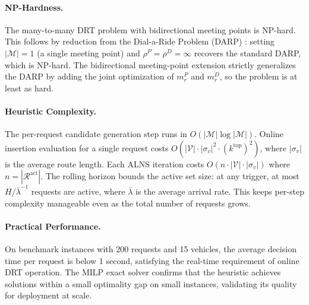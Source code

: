 \paragraph{NP-Hardness.}
The many-to-many DRT problem with bidirectional meeting points is NP-hard. This follows
by reduction from the Dial-a-Ride Problem (DARP) \citep{cordeau2007}: setting
$|\mathcal{M}| = 1$ (a single meeting point) and $\rho^P = \rho^D = \infty$ recovers
the standard DARP, which is NP-hard. The bidirectional meeting-point extension strictly
generalizes the DARP by adding the joint optimization of $m_r^P$ and $m_r^D$, so the
problem is at least as hard.

\paragraph{Heuristic Complexity.}
The per-request candidate generation step runs in $O(|\mathcal{M}| \log |\mathcal{M}|)$.
Online insertion evaluation for a single request costs
$O(|\mathcal{V}| \cdot |\sigma_v|^2 \cdot (k^{\text{top}})^2)$, where $|\sigma_v|$ is
the average route length. Each ALNS iteration costs
$O(n \cdot |\mathcal{V}| \cdot |\sigma_v|)$ where $n = |\mathcal{R}^{\text{act}}|$.
The rolling horizon bounds the active set size: at any trigger, at most
$H / \bar{\lambda}^{-1}$ requests are active, where $\bar{\lambda}$ is the average
arrival rate. This keeps per-step complexity manageable even as the total number of
requests grows.

\paragraph{Practical Performance.}
On benchmark instances with 200 requests and 15 vehicles, the average decision time per
request is below 1 second, satisfying the real-time requirement of online DRT operation.
The MILP exact solver confirms that the heuristic achieves solutions within a small
optimality gap on small instances, validating its quality for deployment at scale.
